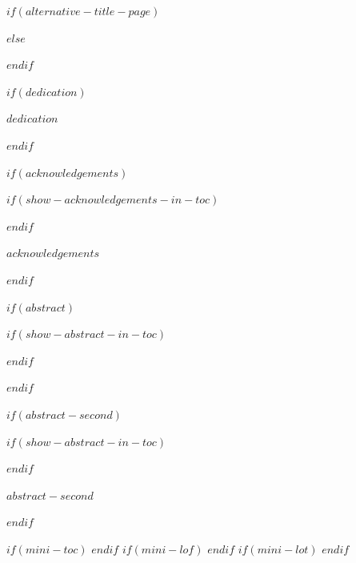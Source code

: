\documentclass[a4paper, $if(page-layout)$$page-layout$$endif$]{templates/ociamthesis}
\begin{document}
\begin{romanpages}

$if(alternative-title-page)$

$else$
\maketitle
$endif$

$if(dedication)$
\begin{dedication}
  $dedication$
\end{dedication}
$endif$

$if(acknowledgements)$

$if(show-acknowledgements-in-toc)$
\renewcommand{\numberstyleacks}{plain}
\renewcommand{\numberstyleabstract}{plain}
$endif$

\begin{acknowledgements}
 	$acknowledgements$
\end{acknowledgements}

$endif$


$if(abstract)$

$if(show-abstract-in-toc)$
\renewcommand{\numberstyleabstract}{plain}
$endif$

\renewcommand{\abstracttitle}{$abstract-heading$}
\begin{abstract}
	$abstract$
\end{abstract}

$endif$

$if(abstract-second)$

$if(show-abstract-in-toc)$
\renewcommand{\numberstyleabstract}{plain}
$endif$

\renewcommand{\abstractsecondtitle}{$abstract-second-heading$}
\begin{abstractsecond}
	$abstract-second$
\end{abstractsecond}

$endif$

$if(mini-toc)$
  \dominitoc %
$endif$
$if(mini-lof)$
  \dominilof  %
$endif$
$if(mini-lot)$
  \dominilot  %
$endif$


\end{romanpages}
\end{document}
